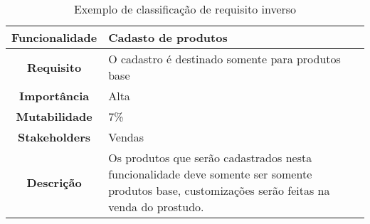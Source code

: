       \begin{table}[h!]
        \centering
        \begin{tabular}{|c|p{10cm}|}
          \hline
          \textbf{Funcionalidade} &
          Cadasto de produtos \\ \hline
          \textbf{Requisito} &
          O cadastro é destinado somente para produtos base \\ \hline
          \textbf{Importância} &
          Alta \\ \hline
          \textbf{Mutabilidade} &
          7\% \\ \hline
          \textbf{Stakeholders} &
          Vendas \\ \hline
          \textbf{Descrição} &
          Os produtos que serão cadastrados nesta funcionalidade deve somente ser
          somente produtos base, customizações serão feitas na venda do prostudo. \\ \hline
        \end{tabular}
        \caption{Exemplo de classificação de requisito inverso}
        \label{Tabela:7}
      \end{table}

